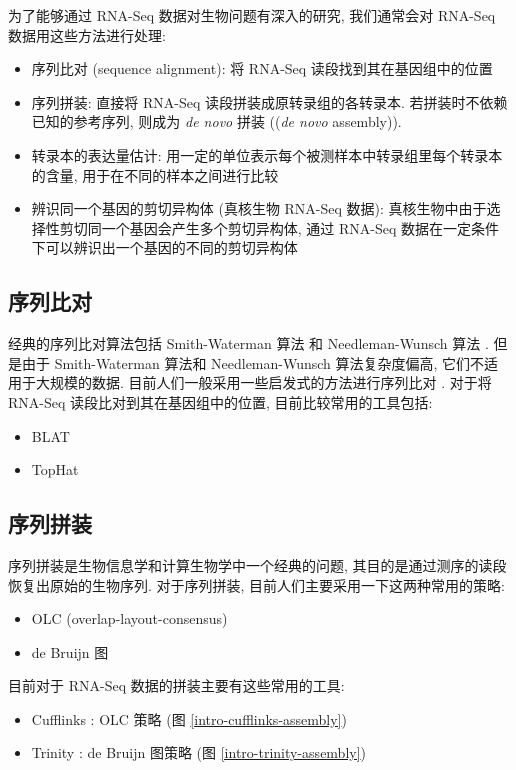 为了能够通过 RNA-Seq 数据对生物问题有深入的研究, 
我们通常会对 RNA-Seq 数据用这些方法进行处理:
\begin{itemize}
\item 序列比对 (sequence alignment): 将 RNA-Seq 读段找到其在基因组中的位置

\item 序列拼装: 
直接将 RNA-Seq 读段拼装成原转录组的各转录本. 若拼装时不依赖已知的参考序列, 
则成为 \textit{de novo} 拼装 ((\textit{de novo} assembly)). 

\item 转录本的表达量估计: 用一定的单位表示每个被测样本中转录组里每个转录本的含量, 
用于在不同的样本之间进行比较

\item 辨识同一个基因的剪切异构体 (真核生物 RNA-Seq 数据): 真核生物中由于选择性剪切同一个基因会产生多个剪切异构体, 
通过 RNA-Seq 数据在一定条件下可以辨识出一个基因的不同的剪切异构体
\end{itemize}

\subsection{序列比对}
经典的序列比对算法包括 Smith-Waterman 算法 \cite{SmithWaterman1981} 和 Needleman-Wunsch 算法 \cite{needleman1970general}. 
但是由于 Smith-Waterman 算法和 Needleman-Wunsch 算法复杂度偏高, 它们不适用于大规模的数据. 
目前人们一般采用一些启发式的方法进行序列比对 \cite{isaev2004introduction}. 
对于将 RNA-Seq 读段比对到其在基因组中的位置, 目前比较常用的工具包括: 
\begin{itemize}
\item BLAT \cite{kent2002blat}
\item TopHat \cite{trapnell2009tophat}
\end{itemize}

\subsection{序列拼装}
序列拼装是生物信息学和计算生物学中一个经典的问题, 
其目的是通过测序的读段恢复出原始的生物序列. 对于序列拼装, 目前人们主要采用一下这两种常用的策略: 
\begin{itemize}
\item OLC (overlap-layout-consensus) \cite{greenphrap, bonfield1995new, 
kececioglu1995combinatorial, myers1995toward, huang1999cap3}

\item de Bruijn 图 \cite{pevzner2001eulerian}
\end{itemize}
目前对于 RNA-Seq 数据的拼装主要有这些常用的工具: 
\begin{itemize}
\item Cufflinks \cite{cufflinks.2010}: 
OLC 策略 (图 \ref{intro-cufflinks-assembly})

\item Trinity \cite{grabherr2011full}: 
de Bruijn 图策略 (图 \ref{intro-trinity-assembly})
\end{itemize}

